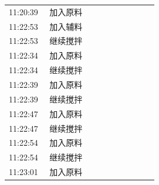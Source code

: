 \documentclass[UTF8,10pt,a4paper,fontset=fandol]{ctexart}
\newcommand{\fieldvalue}[1]{#1}
\begin{document}
\begin{tabular}{p{0.25\linewidth}p{0.67\linewidth}}
\fieldvalue{11:20:39} &
\fieldvalue{加入原料} \\

\fieldvalue{11:22:53} &
\fieldvalue{加入辅料} \\

\fieldvalue{11:22:53} &
\fieldvalue{继续搅拌} \\

\fieldvalue{11:22:34} &
\fieldvalue{加入原料} \\

\fieldvalue{11:22:34} &
\fieldvalue{继续搅拌} \\

\fieldvalue{11:22:39} &
\fieldvalue{加入原料} \\

\fieldvalue{11:22:39} &
\fieldvalue{继续搅拌} \\

\fieldvalue{11:22:47} &
\fieldvalue{加入原料} \\

\fieldvalue{11:22:47} &
\fieldvalue{继续搅拌} \\

\fieldvalue{11:22:54} &
\fieldvalue{加入原料} \\

\fieldvalue{11:22:54} &
\fieldvalue{继续搅拌} \\

\fieldvalue{11:23:01} &
\fieldvalue{加入原料} \\


\end{tabular}
\end{document}
